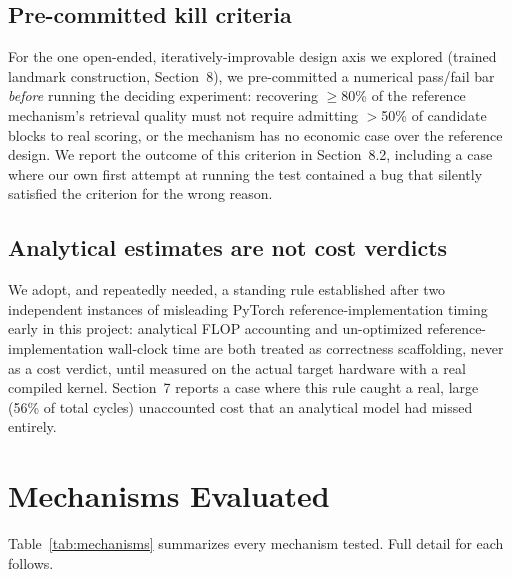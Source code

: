\documentclass[11pt]{article}
\begin{document}
\subsection{Pre-committed kill criteria}

For the one open-ended, iteratively-improvable design axis we explored (trained landmark
construction, Section~8), we pre-committed a numerical pass/fail bar
\emph{before} running the deciding experiment: recovering $\geq$80\% of the reference
mechanism's retrieval quality must not require admitting $>$50\% of candidate blocks to
real scoring, or the mechanism has no economic case over the reference design. We report
the outcome of this criterion in Section~8.2, including a case where our own first
attempt at running the test contained a bug that silently satisfied the criterion for the
wrong reason.

\subsection{Analytical estimates are not cost verdicts}

We adopt, and repeatedly needed, a standing rule established after two independent
instances of misleading PyTorch reference-implementation timing early in this project:
analytical FLOP accounting and un-optimized reference-implementation wall-clock time are
both treated as correctness scaffolding, never as a cost verdict, until measured on the
actual target hardware with a real compiled kernel. Section~7 reports a case where
this rule caught a real, large (56\% of total cycles) unaccounted cost that an analytical
model had missed entirely.

\section{Mechanisms Evaluated}

Table~\ref{tab:mechanisms} summarizes every mechanism tested. Full detail for each follows.
\end{document}
